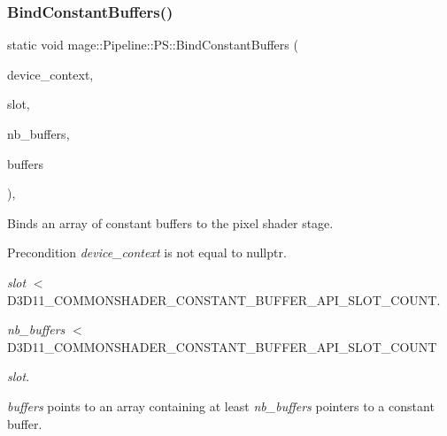 \subsubsection{\texorpdfstring{Bind\+Constant\+Buffers()}{BindConstantBuffers()}}
{\footnotesize\ttfamily static void mage\+::\+Pipeline\+::\+P\+S\+::\+Bind\+Constant\+Buffers (\begin{DoxyParamCaption}\item[{I\+D3\+D11\+Device\+Context2 $\ast$}]{device\+\_\+context,  }\item[{\hyperlink{namespacemage_a41c104c036fba3756a74e19f793eeaa1}{U32}}]{slot,  }\item[{\hyperlink{namespacemage_a41c104c036fba3756a74e19f793eeaa1}{U32}}]{nb\+\_\+buffers,  }\item[{I\+D3\+D11\+Buffer $\ast$const $\ast$}]{buffers }\end{DoxyParamCaption})\hspace{0.3cm}{\ttfamily [static]}, {\ttfamily [noexcept]}}

Binds an array of constant buffers to the pixel shader stage.

\begin{DoxyPrecond}{Precondition}
{\itshape device\+\_\+context} is not equal to {\ttfamily nullptr}. 

{\itshape slot} $<$ {\ttfamily D3\+D11\+\_\+\+C\+O\+M\+M\+O\+N\+S\+H\+A\+D\+E\+R\+\_\+\+C\+O\+N\+S\+T\+A\+N\+T\+\_\+\+B\+U\+F\+F\+E\+R\+\_\+\+A\+P\+I\+\_\+\+S\+L\+O\+T\+\_\+\+C\+O\+U\+NT}. 

{\itshape nb\+\_\+buffers} $<$ {\ttfamily D3\+D11\+\_\+\+C\+O\+M\+M\+O\+N\+S\+H\+A\+D\+E\+R\+\_\+\+C\+O\+N\+S\+T\+A\+N\+T\+\_\+\+B\+U\+F\+F\+E\+R\+\_\+\+A\+P\+I\+\_\+\+S\+L\+O\+T\+\_\+\+C\+O\+U\+NT} 
\begin{DoxyItemize}
\item {\itshape slot}. 
\end{DoxyItemize}

{\itshape buffers} points to an array containing at least {\itshape nb\+\_\+buffers} pointers to a constant buffer. 
\end{DoxyPrecond}


